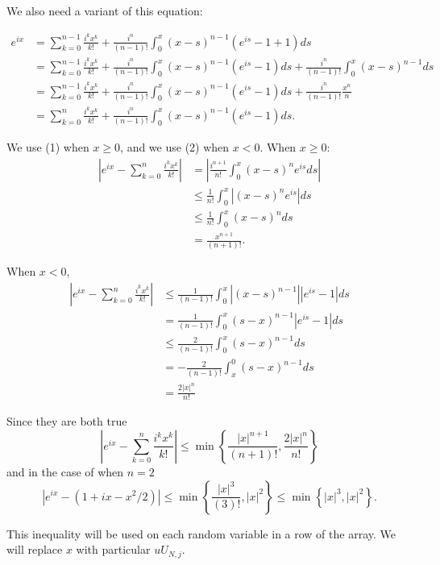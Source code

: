 \documentclass{article}
\begin{document}
We also need a variant of this equation:

\begin{align*}
e^{ix} &= \sum_{k=0}^{n-1} \frac{ i^{k}x^k }{k!} + \frac{i^{n} }{(n-1)!}\int_0^x (x-s)^{n-1} (e^{is} -1 + 1)  ds \tag{replace $n$ with $n-1$} \\
&= \sum_{k=0}^{n-1} \frac{ i^{k}x^k }{k!} + \frac{i^{n} }{(n-1)!}\int_0^x (x-s)^{n-1} (e^{is} -1)  ds + \frac{i^{n} }{(n-1)!}\int_0^x (x-s)^{n-1}ds \\
&= \sum_{k=0}^{n-1} \frac{ i^{k}x^k }{k!} + \frac{i^{n} }{(n-1)!}\int_0^x (x-s)^{n-1} (e^{is} -1)  ds + \frac{i^{n} }{(n-1)!}\frac{x^n}{n} \tag{substitution} \\
&= \sum_{k=0}^{n} \frac{ i^{k}x^k }{k!} + \frac{i^{n} }{(n-1)!}\int_0^x (x-s)^{n-1} (e^{is} -1)  ds. \tag{2}
\end{align*}

We use (1) when $x \ge 0$, and we use (2) when $x < 0$. When $x \ge 0$:
\begin{align*}
\left| e^{ix} - \sum_{k=0}^{n} \frac{ i^{k}x^k }{k!} \right| &= \left| \frac{i^{n+1} }{n!}\int_0^x (x-s)^n e^{is}  ds \right| \\
&\le \frac{1 }{n!}\int_0^x |(x-s)^n e^{is}|  ds \tag{Jensen's} \\
&\le \frac{1 }{n!}\int_0^x (x-s)^n   ds \\
&= \frac{x^{n+1}}{(n+1)!} \tag{substitution}.
\end{align*}

When $x < 0$, 
\begin{align*}
\left| e^{ix} - \sum_{k=0}^{n} \frac{ i^{k}x^k }{k!} \right| &\le \frac{1 }{(n-1)!}\int_0^x |(x-s)^{n-1}| |e^{is} -1|  ds \tag{Jensen's}  \\
&= \frac{1 }{(n-1)!}\int_0^x ( s - x)^{n-1} |e^{is} -1|  ds \tag{ $x < 0$ } \\
&\le \frac{2 }{(n-1)!}\int_0^x (s-x)^{n-1}   ds \tag{tri-ineq} \\
&= -\frac{2 }{(n-1)!}\int_x^0 (s-x)^{n-1}   ds \\
&= \frac{2 |x|^n}{n!}\tag{substitution}
\end{align*}

Since they are both true
\[
\left| e^{ix} - \sum_{k=0}^{n} \frac{ i^{k}x^k }{k!} \right| \le \min \left\{\frac{|x|^{n+1}}{(n+1)!}  , \frac{2 |x|^n}{n!} \right\}
\]
and in the case of when $n=2$
\[
\left| e^{ix} - (1 + ix -x^2/2)  \right| \le \min \left\{ \frac{|x|^{3}}{(3)!}  ,  |x|^2 \right\}\le \min \left\{ |x|^{3}  ,  |x|^2 \right\}.
\]

This inequality will be used on each random variable in a row of the array. We will replace $x$ with particular $u U_{N,j}$.
\end{document}
